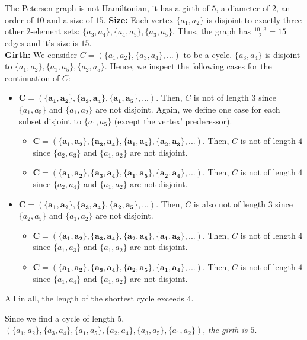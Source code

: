 \documentclass[a4paper]{article}
\begin{document}
\begin{solution}{9}
\begin{theorem}{The Petersen graph is not Hamiltonian, it has a girth of $5$, a diameter of $2$, an order of $10$ and a size of $15$.}
			\textbf{Size:} Each vertex $\{a_1, a_2\}$ is disjoint to exactly three other $2$-element sets: $\{a_3, a_4\}, \{a_4, a_5\}, \{a_3, a_5\}$. Thus, the graph has $\frac{10 \cdot 3}{2} = 15$ edges and it's size is $15$.\\

			\textbf{Girth:} We consider $C = (\{a_1, a_2\}, \{a_3, a_4\}, ...)$ to be a cycle. $\{a_3, a_4\}$ is disjoint to $\{a_1, a_2\}, \{a_1, a_5\}, \{a_2, a_5\}$. Hence, we inspect the following cases for the continuation of $C$:
			\begin{itemize}
				\item $\mathbf{C = (\{a_1, a_2\}, \{a_3, a_4\}, \{a_1, a_5\}, ...)}$. Then, $C$ is not of length $3$ since $\{a_1, a_5\}$ and $\{a_1, a_2\}$ are not disjoint. Again, we define one case for each subset disjoint to $\{a_1, a_5\}$ (except the vertex' predecessor).
					\begin{itemize}
						\item $\mathbf{C = (\{a_1, a_2\}, \{a_3, a_4\}, \{a_1, a_5\}, \{a_2, a_3\}, ...)}$. Then, $C$ is not of length $4$ since $\{a_2, a_3\}$ and $\{a_1, a_2\}$ are not disjoint.
						\item $\mathbf{C = (\{a_1, a_2\}, \{a_3, a_4\}, \{a_1, a_5\}, \{a_2, a_4\}, ...)}$. Then, $C$ is not of length $4$ since $\{a_2, a_4\}$ and $\{a_1, a_2\}$ are not disjoint.
					\end{itemize}
				\item $\mathbf{C = (\{a_1, a_2\}, \{a_3, a_4\}, \{a_2, a_5\}, ...)}$. Then, $C$ is also not of length $3$ since $\{a_2, a_5\}$ and $\{a_1, a_2\}$ are not disjoint.
					\begin{itemize}
						\item $\mathbf{C = (\{a_1, a_2\}, \{a_3, a_4\}, \{a_2, a_5\}, \{a_1, a_3\}, ...)}$. Then, $C$ is not of length $4$ since $\{a_1, a_3\}$ and $\{a_1, a_2\}$ are not disjoint.
						\item $\mathbf{C = (\{a_1, a_2\}, \{a_3, a_4\}, \{a_2, a_5\}, \{a_1, a_4\}, ...)}$. Then, $C$ is not of length $4$ since $\{a_1, a_4\}$ and $\{a_1, a_2\}$ are not disjoint.
					\end{itemize}
			\end{itemize}
			All in all, the length of the shortest cycle exceeds $4$.

			Since we find a cycle of length $5$, $(\{a_1, a_2\}, \{a_3, a_4\}, \{a_1, a_5\}, \{a_2, a_4\}, \{a_3, a_5\}, \{a_1, a_2\})$, \emph{the girth is $5$}.\\


\end{theorem}
\end{solution}
\end{document}
